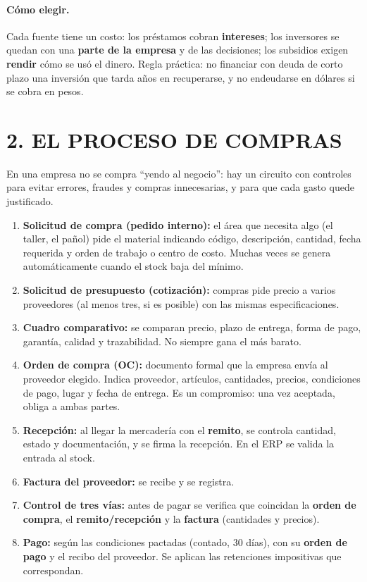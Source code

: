 \paragraph*{Cómo elegir.}
Cada fuente tiene un costo: los préstamos cobran \textbf{intereses}; los inversores se quedan
con una \textbf{parte de la empresa} y de las decisiones; los subsidios exigen
\textbf{rendir} cómo se usó el dinero. Regla práctica: no financiar con deuda de corto plazo
una inversión que tarda años en recuperarse, y no endeudarse en dólares si se cobra en pesos.

\section*{2. EL PROCESO DE COMPRAS}

En una empresa no se compra ``yendo al negocio'': hay un circuito con controles para evitar
errores, fraudes y compras innecesarias, y para que cada gasto quede justificado.

\begin{enumerate}
  \item \textbf{Solicitud de compra (pedido interno):} el área que necesita algo (el taller, el
        pañol) pide el material indicando código, descripción, cantidad, fecha requerida y
        orden de trabajo o centro de costo. Muchas veces se genera automáticamente cuando el
        stock baja del mínimo.
  \item \textbf{Solicitud de presupuesto (cotización):} compras pide precio a varios
        proveedores (al menos tres, si es posible) con las mismas especificaciones.
  \item \textbf{Cuadro comparativo:} se comparan precio, plazo de entrega, forma de pago,
        garantía, calidad y trazabilidad. No siempre gana el más barato.
  \item \textbf{Orden de compra (OC):} documento formal que la empresa envía al proveedor
        elegido. Indica proveedor, artículos, cantidades, precios, condiciones de pago, lugar y
        fecha de entrega. Es un compromiso: una vez aceptada, obliga a ambas partes.
  \item \textbf{Recepción:} al llegar la mercadería con el \textbf{remito}, se controla
        cantidad, estado y documentación, y se firma la recepción. En el ERP se valida la
        entrada al stock.
  \item \textbf{Factura del proveedor:} se recibe y se registra.
  \item \textbf{Control de tres vías:} antes de pagar se verifica que coincidan la
        \textbf{orden de compra}, el \textbf{remito/recepción} y la \textbf{factura}
        (cantidades y precios).
  \item \textbf{Pago:} según las condiciones pactadas (contado, 30 días), con su
        \textbf{orden de pago} y el recibo del proveedor. Se aplican las retenciones
        impositivas que correspondan.
\end{enumerate}


